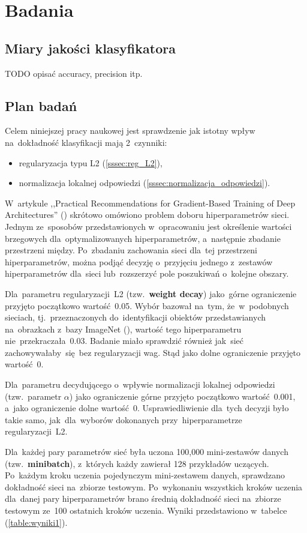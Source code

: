 \chapter{Badania}
\section{Miary jakości klasyfikatora}
TODO opisać accuracy, precision itp.

\section{Plan badań}
Celem niniejszej pracy naukowej jest sprawdzenie jak istotny wpływ na~dokładność klasyfikacji mają 2~czynniki:
\begin{itemize}
    \item regularyzacja typu L2 (\ref{sssec:reg_L2}),
    \item normalizacja lokalnej odpowiedzi (\ref{sssec:normalizacja_odpowiedzi}).
\end{itemize}

W~artykule ,,Practical Recommendations for Gradient-Based Training of Deep Architectures''
(\cite{practical-gradient-based}) skrótowo omówiono problem doboru hiperparametrów sieci. Jednym ze~sposobów
przedstawionych w~opracowaniu jest określenie wartości brzegowych dla~optymalizowanych hiperparametrów,
a~następnie zbadanie przestrzeni między. Po~zbadaniu zachowania sieci dla~tej przestrzeni hiperparametrów, można podjąć
decyzję o~przyjęciu jednego z~zestawów hiperparametrów dla~sieci lub~rozszerzyć pole poszukiwań o~kolejne obszary.

Dla~parametru regularyzacji~L2 (tzw.~\textbf{weight decay}) jako~górne ograniczenie przyjęto początkowo wartość~0.05.
Wybór bazował na~tym, że~w~podobnych sieciach, tj.~przeznaczonych do~identyfikacji obiektów przedstawianych na~obrazkach
z~bazy ImageNet (\cite{imagenet}), wartość tego hiperparametru nie~przekraczała~0.03. Badanie miało sprawdzić
również jak~sieć zachowywałaby~się~bez regularyzacji wag. Stąd jako dolne ograniczenie przyjęto wartość~0.

Dla~parametru decydującego o~wpływie normalizacji lokalnej odpowiedzi (tzw.~parametr $\alpha$) jako ograniczenie górne
przyjęto początkowo wartość~0.001, a~jako ograniczenie dolne wartość~0. Usprawiedliwienie dla~tych decyzji było
takie samo, jak~dla~wyborów dokonanych przy~hiperparametrze regularyzacji~L2.

Dla~każdej pary parametrów sieć była uczona 100,000 mini-zestawów danych (tzw.~\textbf{minibatch}), z~których
każdy zawierał 128 przykładów uczących. Po~każdym kroku uczenia pojedynczym mini-zestawem danych, sprawdzano
dokładność sieci na~zbiorze testowym. Po~wykonaniu wszystkich kroków uczenia dla~danej pary hiperparametrów
brano średnią dokładność sieci na~zbiorze testowym ze~100 ostatnich kroków uczenia. Wyniki przedstawiono w~tabelce
(\ref{table:wyniki1}).

